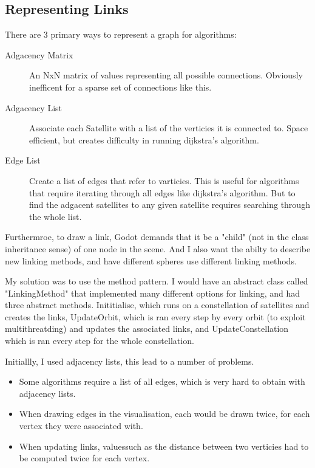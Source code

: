 \documentclass[12pt]{article}
\begin{document}
\subsection{Representing Links}

There are 3 primary ways to represent a graph for algorithms:

\begin{description}
\item[Adgacency Matrix] An NxN matrix of values representing all possible connections. Obviously inefficent for a sparse set of connections like this.
\item[Adgacency List] Associate each Satellite with a list of the verticies it is connected to. Space efficient, but creates difficulty in running dijkstra's algorithm.
\item[Edge List] Create a list of edges that refer to varticies. This is useful for algorithms that require iterating through all edges like dijkstra's algorithm. But to find the adgacent satellites to any given satellite requires searching through the whole list.
\end{description}

Furthermroe, to draw a link, Godot demands that it be a "child" (not in the class inheritance sense) of one node in the scene. And I also want the abilty to describe new linking methods, and have different spheres use different linking methods.

My solution was to use the method pattern. I would have an abstract class called "LinkingMethod" that implemented many different options for linking, and had three abstract methods. Inititialise, which runs on a constellation of satellites and creates the links, UpdateOrbit, which is ran every step by every orbit (to exploit multithreatding) and updates the associated links, and UpdateConstellation which is ran every step for the whole constellation.

Initiallly, I used adjacency lists, this lead to a number of problems.

\begin{itemize}
\item Some algorithms require a list of all edges, which is very hard to obtain with adjacency lists.
\item When drawing edges in the visualisation, each would be drawn twice, for each vertex they were associated with.
\item When updating links, valuessuch as the distance between two verticies had to be computed twice for each vertex.
\end{itemize}
\end{document}
